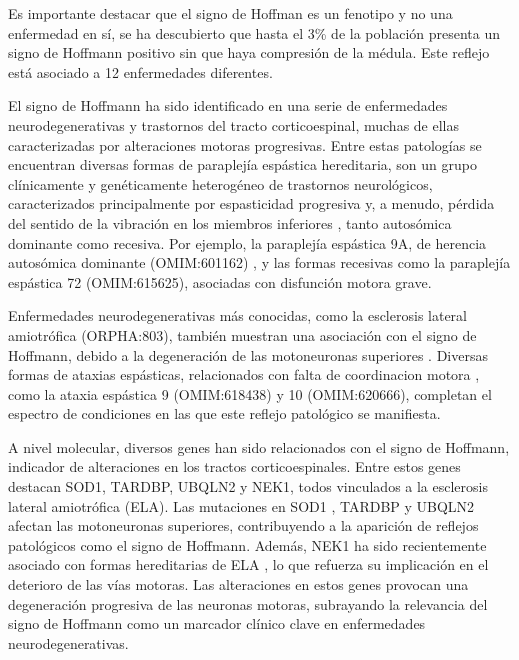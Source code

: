 Es importante destacar que el signo de Hoffman es un fenotipo y no una enfermedad en sí, se ha descubierto que hasta el 3\% de la población presenta un signo de Hoffmann positivo sin que haya compresión de la médula. Este reflejo está asociado a 12 enfermedades diferentes\cite{whitney}.

El signo de Hoffmann ha sido identificado en una serie de enfermedades neurodegenerativas y trastornos del tracto corticoespinal, muchas de ellas caracterizadas por alteraciones motoras progresivas. Entre estas patologías se encuentran diversas formas de paraplejía espástica hereditaria, son un grupo clínicamente y genéticamente heterogéneo de trastornos neurológicos, caracterizados principalmente por espasticidad progresiva y, a menudo, pérdida del sentido de la vibración en los miembros inferiores \cite{Esteves2014}, tanto autosómica dominante como recesiva. Por ejemplo, la paraplejía espástica 9A, de herencia autosómica dominante (OMIM:601162) \cite{10.1093/brain/awv143}, y las formas recesivas como la paraplejía espástica 72 (OMIM:615625), asociadas con disfunción motora grave.

Enfermedades neurodegenerativas más conocidas, como la esclerosis lateral amiotrófica (ORPHA:803), también muestran una asociación con el signo de Hoffmann, debido a la degeneración de las motoneuronas superiores \cite{RIANCHO201927}. Diversas formas de ataxias espásticas, relacionados con falta de coordinacion motora \cite{Pedroso2022}, como la ataxia espástica 9 (OMIM:618438) y 10 (OMIM:620666), completan el espectro de condiciones en las que este reflejo patológico se manifiesta.

A nivel molecular, diversos genes han sido relacionados con el signo de Hoffmann, indicador de alteraciones en los tractos corticoespinales. Entre estos genes destacan SOD1, TARDBP, UBQLN2 y NEK1, todos vinculados a la esclerosis lateral amiotrófica (ELA). Las mutaciones en SOD1 \cite{zhao2022g41d}, TARDBP \cite{sanchez2022atypical} y UBQLN2 \cite{teyssou:hal-03001781} afectan las motoneuronas superiores, contribuyendo a la aparición de reflejos patológicos como el signo de Hoffmann. Además, NEK1 ha sido recientemente asociado con formas hereditarias de ELA \cite{mann2023NEK1}, lo que refuerza su implicación en el deterioro de las vías motoras. Las alteraciones en estos genes provocan una degeneración progresiva de las neuronas motoras, subrayando la relevancia del signo de Hoffmann como un marcador clínico clave en enfermedades neurodegenerativas.
